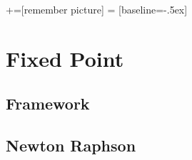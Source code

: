 %
%
%
%
%

\date{January 7 2008}



+=[remember picture]
 = [baseline=-.5ex]

\everymath{\displaystyle}

\subtitle{}

\begin{frame}
  \maketitle
\end{frame}

\begin{frame}
  \tableofcontents
\end{frame}

\section{Fixed Point}
\label{sec:fixed-point}

\subsection{Framework}
\label{sec:framework}


\begin{frame}{}
  
\end{frame}


\subsection{Newton Raphson}
\label{sec:newton-raphson}

\begin{frame}{}
  
\end{frame}


